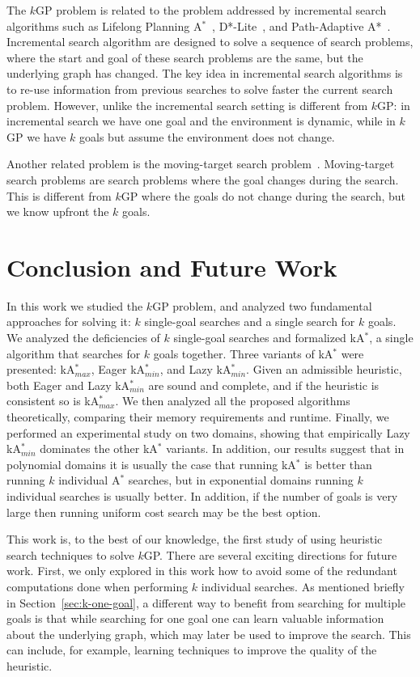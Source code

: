 \documentclass{aicom2e}
\newcommand{\kgs}{$k$GP}
\newcommand{\astar}{A$^*$}
\newcommand{\kastar}{kA$^*$}
\newcommand{\kastarmin}{kA$^*_{min}$}
\newcommand{\kastarmax}{kA$^*_{max}$}
\begin{document}
The \kgs{} problem is related to the problem addressed by incremental search algorithms such as Lifelong Planning \astar{}~\cite{koenig2004lifelong},  D*-Lite~\cite{koenig2005fast}, and Path-Adaptive A*~\cite{hernandez2015reusing}. Incremental search algorithm are designed to solve a sequence of search problems, where the start and goal of these search problems are the same, but the underlying graph has changed. The key idea in incremental search algorithms is to re-use information from previous searches to solve faster the current search problem. However, unlike the incremental search setting is different from \kgs{}: in incremental search we have one goal and the environment is dynamic, while in \kgs{} we have $k$ goals but assume the environment does not change.

Another related problem is the moving-target search problem~\cite{koenig2007speeding,ishida1991moving}. Moving-target search problems are search problems where the goal changes during the search. This is different from \kgs{} where the goals do not change during the search, but we know upfront the $k$ goals.


\section{Conclusion and Future Work}
In this work we studied the \kgs{} problem, and analyzed two fundamental approaches for solving it: $k$ single-goal searches and a single search for $k$ goals. We analyzed the deficiencies of $k$ single-goal searches and formalized \kastar{}, a single algorithm that searches for $k$ goals together.
Three variants of \kastar{} were presented: \kastarmax{}, Eager \kastarmin{}, and Lazy \kastarmin{}. Given an admissible heuristic, both Eager and Lazy \kastarmin{} are sound and complete, and if the heuristic is consistent so is \kastarmax{}. We then analyzed all the proposed algorithms theoretically, comparing their memory requirements and runtime. Finally, we performed an experimental study on two domains, showing that empirically Lazy \kastarmin{} dominates the other \kastar{} variants. In addition, our results suggest that
in polynomial domains it is usually the case that running \kastar{} is better than running $k$ individual \astar{} searches, but in exponential domains running $k$ individual searches is usually better. In addition, if the number of goals is very large then running uniform cost search may be the best option.


This work is, to the best of our knowledge, the first study of using heuristic search techniques to solve \kgs{}. There are several exciting directions for future work. First, we only explored in this work how to avoid some of the redundant computations done when performing $k$ individual searches. As mentioned briefly in Section~\ref{sec:k-one-goal}, a different way to benefit from searching for multiple goals is that while searching for one goal one can learn valuable information about the underlying graph, which may later be used to improve the search. This can include, for example, learning techniques to improve the quality of the heuristic.
\end{document}
